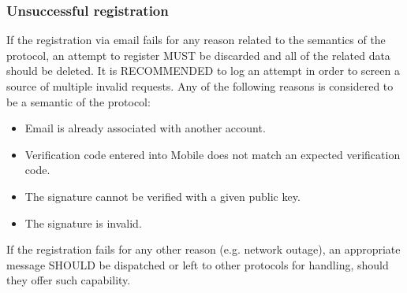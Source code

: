             \subsubsection{Unsuccessful registration}
            If the registration via email fails for any reason related to the semantics of the protocol, an attempt to
            register MUST be discarded and all of the related data should be deleted. It is RECOMMENDED to log an attempt
            in order to screen a source of multiple invalid requests. Any of the following reasons is considered to be
            a semantic of the protocol:
                \begin{itemize}
                    \item Email is already associated with another account.
                    \item Verification code entered into Mobile does not match an expected verification code.
                    \item The signature cannot be verified with a given public key.
                    \item The signature is invalid.
                \end{itemize}
            If the registration fails for any other reason (e.g. network outage), an appropriate message SHOULD be
            dispatched or left to other protocols for handling, should they offer such capability.
